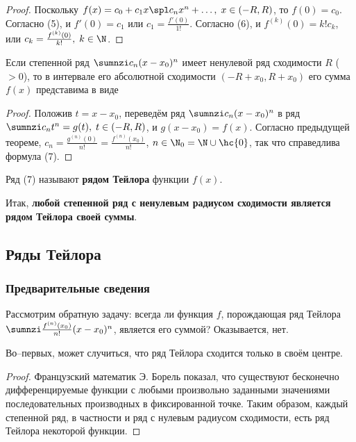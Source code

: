 \documentclass[a4paper]{article}
\begin{document}
\begin{proof}
Поскольку $f(x) = c_0+c_1x \spl c_nx^n + \ldots, \; x\in(-R,R)$, то
$f(0) = c_0$. Согласно (5),  и $f'(0)=c_1$ или $c_1 =
\frac{f'(0)}{1!}$. Согласно (6),  и $f^{(k)}(0)=k! c_k$, или $c_k =
\frac{f^{(k)}(0)}{k!}, \; k\in\N$.
\end{proof}

\begin{theorem}
Если степенной ряд $\sumnzi c_n(x-x_0)^n$ имеет ненулевой ряд
сходимости $R$ ($>0$), то в интервале его абсолютной сходимости
$(-R+x_0, R+x_0)$ его сумма $f(x)$ представима в виде 
\end{theorem}

\begin{proof}
Положив $t=x-x_0$, переведём ряд $\sumnzi c_n(x-x_0)^n$ в ряд
$\sumnzi c_nt^n = g(t), \; t\in(-R,R)$, и $g(x-x_0)=f(x)$. Согласно
предыдущей теореме, $c_n = \frac{g^{(n)}(0)}{n!} =
\frac{f^{(n)}(x_0)}{n!}$, $n\in\N_0 = \N\cup\hc{0}$, так что
справедлива формула (7).
\end{proof}

Ряд (7) называют \textbf{рядом Тейлора} функции $f(x)$.

Итак, \textbf{любой степенной ряд с ненулевым радиусом сходимости
является рядом Тейлора своей суммы}.

\subsection{Ряды Тейлора}
\subsubsection{Предварительные сведения}

Рассмотрим обратную задачу: всегда ли функция $f$, порождающая ряд
Тейлора $\sumnzi \frac{f^{(n)}(x_0)}{n!} (x-x_0)^n$, является его
суммой? Оказывается, нет.

Во--первых, может случиться, что ряд Тейлора сходится только в своём
центре.

\begin{proof}
Французский математик Э. Борель показал, что существуют бесконечно
дифференцируемые функции с любыми произвольно заданными значениями
последовательных производных в фиксированной точке. Таким образом,
каждый степенной ряд, в частности и ряд с нулевым радиусом
сходимости, есть ряд Тейлора некоторой функции.
\end{proof}
\end{document}
